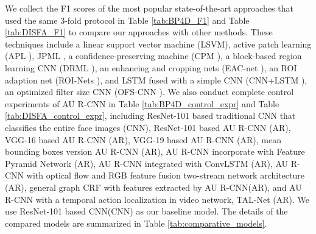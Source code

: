 \documentclass[5p,twocolumn]{elsarticle}
\begin{document}
We collect the F1 scores of the most popular state-of-the-art approaches that used the same 3-fold protocol in Table \ref{tab:BP4D_F1} and Table \ref{tab:DISFA_F1} to compare our approaches with other methods. These techniques include a linear support vector machine (LSVM), active patch learning (APL \cite{zhong2015learning}), JPML \cite{Zhao2016}, a confidence-preserving machine (CPM \cite{zeng2015confidence}), a block-based region learning CNN (DRML \cite{Zhao2016b}), an enhancing and
cropping nets (EAC-net \cite{li2017eac}), an ROI adaption net (ROI-Nets \cite{li2017action}), and LSTM fused with a simple CNN (CNN+LSTM \cite{Chu2017Learning}), an optimized filter size CNN (OFS-CNN \cite{han2017optimizing}). We also conduct complete control experiments of AU R-CNN in Table \ref{tab:BP4D_control_expr} and Table \ref{tab:DISFA_control_expr}, including ResNet-101 based traditional CNN that classifies the entire face images (CNN), ResNet-101 based AU R-CNN (AR), VGG-16 based AU R-CNN (AR), VGG-19 based AU R-CNN (AR), mean bounding boxes version AU R-CNN (AR), AU R-CNN incorporate with Feature Pyramid Network \cite{lin2017feature}(AR), AU R-CNN integrated with ConvLSTM \cite{xingjian2015convolutional} (AR),
AU R-CNN with optical flow and RGB feature fusion two-stream network architecture \cite{feichtenhofer2016convolutional}(AR), general graph CRF with features extracted by AU R-CNN(AR), and AU R-CNN with a temporal action localization in video network, TAL-Net \cite{chao2018rethinking}(AR). We use ResNet-101 based CNN(CNN) as our baseline model. The details of the compared models are summarized in Table \ref{tab:comparative_models}.
\end{document}

